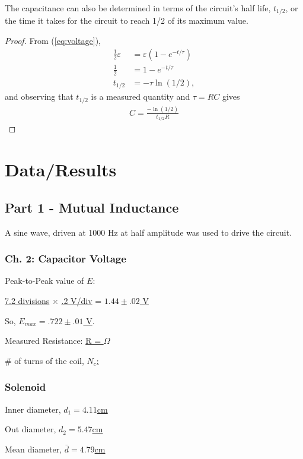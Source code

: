 \documentclass[twocolumn,english]{IEEEtran}
\theoremstyle{plain}
\theoremstyle{plain}
\begin{document}
The capacitance can also be determined in terms of the circuit's half life, $t_{1/2}$, or the time it takes for the circuit to reach 1/2 of its maximum value.

\begin{proof}
	From (\ref{eq:voltage}),
	\begin{align*}
		\frac{1}{2}\varepsilon &= \varepsilon(1-e^{-t/\tau}) \\
		\frac{1}{2} &= 1 - e^{-t/\tau} \\
		t_{1/2}&= -\tau\ln(1/2),
	\end{align*}
	and observing that $t_{1/2}$ is a measured quantity and $\tau = RC$ gives
	\begin{align}
		C = \frac{-\ln(1/2)}{t_{1/2}R}
	\end{align}

\end{proof}



\section{Data/Results}
\subsection{Part 1 - Mutual Inductance}
A sine wave, driven at 1000 Hz at half amplitude was used to drive the circuit.

\subsubsection{Ch. 2: Capacitor Voltage}
Peak-to-Peak value of $E$:

\underline{7.2 divisions} $\times$ \underline{.2 V/div}  \hfill = \underline{ $1.44\pm .02$ V}

So, \hfill \underline{$E_{max} =.722 \pm .01$ V}.

Measured Resistance: \hfill \underline{R = $\Omega$} %

\# of turns of the coil, \hfill\underline{$N_c$: } %

\subsubsection{Solenoid}
Inner diameter, \hfill\underline{$d_1 = 4.11$cm}

Out diameter, \hfill\underline{$d_2 = 5.47$cm}

Mean diameter, \hfill\underline{$\bar{d} = 4.79$cm}
\end{document}
